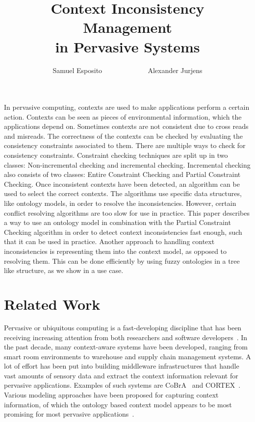 \documentclass[journal]{vgtc}                %
\title{Context Inconsistency Management \\in Pervasive Systems}
\author{Samuel Esposito ~~~~~~~~~~~~ Alexander Jurjens}
\begin{document}


\maketitle

In pervasive computing, contexts are used to make applications perform a certain action. Contexts can be seen as pieces of environmental information, which the applications depend on. Sometimes contexts are not consistent due to cross reads and misreads. The correctness of the contexts can be checked by evaluating the consistency constraints associated to them. There are multiple ways to check for consistency constraints. Constraint checking techniques are split up in two classes: Non-incremental checking and incremental checking. Incremental checking also consists of two classes: Entire Constraint Checking and Partial Constraint Checking. Once inconsistent contexts have been detected, an algorithm can be used to select the correct contexts. The algorithms use specific data structures, like ontology models, in order to resolve the inconsistencies. However, certain conflict resolving algorithms are too slow for use in practice. This paper describes a way to use an ontology model in combination with the Partial Constraint Checking algorithm in order to detect context inconsistencies fast enough, such that it can be used in practice. Another approach to handling context inconsistencies is representing them into the context model, as opposed to resolving them. This can be done efficiently by using fuzzy ontologies in a tree like structure, as we show in a use case.

\section{Related Work}
Pervasive or ubiquitous computing is a fast-developing discipline that has been receiving increasing attention from both researchers and software developers~\cite{xu:2010:PCC}. In the past decade, many context-aware systems have been developed, ranging from smart room environments to warehouse and supply chain management systems. A lot of effort has been put into building middleware infrastructures that handle vast amounts of sensory data and extract the context information relevant for pervasive applications. Examples of such systems are CoBrA~\cite{1276865} and CORTEX~\cite{1276875}. Various modeling approaches have been proposed for capturing context information, of which the ontology based context model appears to be most promising for most pervasive applications~\cite{bu:2006:CCM}.
\end{document}
